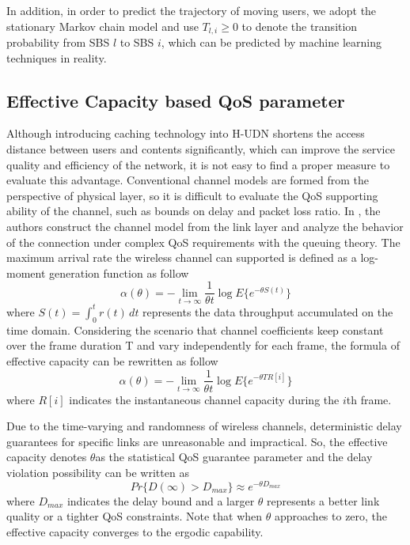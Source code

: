 \documentclass[conference]{IEEEtran}
\begin{document}
In addition, in order to predict the trajectory of moving users, we adopt the stationary Markov chain model and use $T_{l,i}\ge 0$ to denote the transition probability from SBS $l$ to SBS $i$, which can be predicted by machine learning techniques in reality.

\subsection{Effective Capacity based QoS parameter}
Although introducing caching technology into H-UDN shortens the access distance between users and contents significantly, which can improve the service quality and efficiency of the network, it is not easy to find a proper measure to evaluate this advantage. Conventional channel models are formed from the perspective of physical layer, so it is difficult to evaluate the QoS supporting ability of the channel, such as bounds on delay and packet loss ratio. In \cite{1210731}, the authors construct the channel model from the link layer and analyze the behavior of the connection under complex QoS requirements with the queuing theory. The maximum arrival rate the wireless channel can supported is defined as a log-moment generation function as follow
\begin{equation}
\alpha(\theta)=-\lim_{t \to \infty}\frac{1}{\theta t}\log E\{e^{-\theta S(t)}\}
\end{equation}
where $S(t)=\int_{0}^{t} r(t)\, dt$ represents the data throughput accumulated on the time domain. Considering the scenario that channel coefficients keep constant over the frame duration T and vary independently for each frame, the formula of effective capacity can be rewritten as follow
\begin{equation}
\alpha(\theta)=-\lim_{t \to \infty}\frac{1}{\theta t}\log E\{e^{-\theta TR[i]}\}
\end{equation}
where $R[i]$ indicates the instantaneous channel capacity during the $i$th frame.

Due to the time-varying and randomness of wireless channels, deterministic delay guarantees for specific links are unreasonable and impractical. So, the effective capacity denotes
$\theta$as the statistical QoS guarantee parameter and the delay violation possibility can be written as
\begin{equation}
Pr\{D(\infty)>D_{max}\}\approx e^{-\theta D_{max}}
\end{equation}
where $D_{max}$ indicates the delay bound and a larger $\theta$ represents a better link quality or a tighter QoS constraints. Note that when $\theta$ approaches to zero, the effective capacity converges to the ergodic capability.
\end{document}
